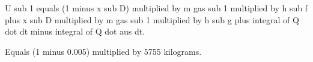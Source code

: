 U sub 1 equals (1 minus x sub D) multiplied by m gas sub 1 multiplied by h sub f plus x sub D multiplied by m gas sub 1 multiplied by h sub g plus integral of Q dot dt minus integral of Q dot aus dt.  

Equals (1 minus 0.005) multiplied by 5755 kilograms.